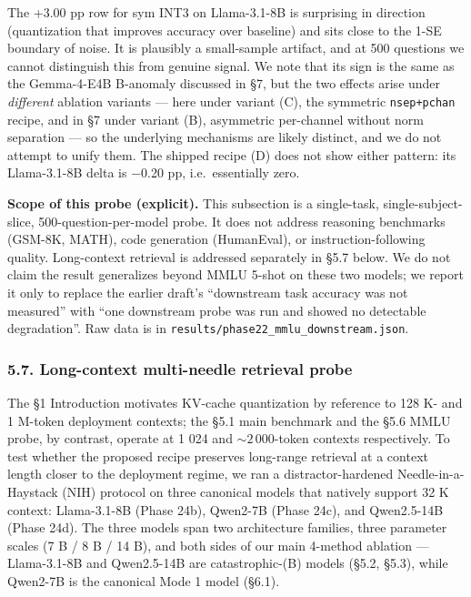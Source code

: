 \documentclass[
]{article}
\begin{document}
The +3.00 pp row for sym INT3 on Llama-3.1-8B is surprising in direction
(quantization that improves accuracy over baseline) and sits close to
the 1-SE boundary of noise. It is plausibly a small-sample artifact, and
at 500 questions we cannot distinguish this from genuine signal. We note
that its sign is the same as the Gemma-4-E4B B-anomaly discussed in §7,
but the two effects arise under \emph{different} ablation variants ---
here under variant (C), the symmetric \texttt{nsep+pchan} recipe, and in
§7 under variant (B), asymmetric per-channel without norm separation ---
so the underlying mechanisms are likely distinct, and we do not attempt
to unify them. The shipped recipe (D) does not show either pattern: its
Llama-3.1-8B delta is −0.20 pp, i.e.~essentially zero.

\textbf{Scope of this probe (explicit).} This subsection is a
single-task, single-subject-slice, 500-question-per-model probe. It does
not address reasoning benchmarks (GSM-8K, MATH), code generation
(HumanEval), or instruction-following quality. Long-context retrieval is
addressed separately in §5.7 below. We do not claim the result
generalizes beyond MMLU 5-shot on these two models; we report it only to
replace the earlier draft's ``downstream task accuracy was not
measured'' with ``one downstream probe was run and showed no detectable
degradation''. Raw data is in
\texttt{results/phase22\_mmlu\_downstream.json}.

\subsubsection{5.7. Long-context multi-needle retrieval
probe}\label{long-context-multi-needle-retrieval-probe}

The §1 Introduction motivates KV-cache quantization by reference to 128
K- and 1 M-token deployment contexts; the §5.1 main benchmark and the
§5.6 MMLU probe, by contrast, operate at 1 024 and \(\sim 2\,000\)-token
contexts respectively. To test whether the proposed recipe preserves
long-range retrieval at a context length closer to the deployment
regime, we ran a distractor-hardened Needle-in-a-Haystack (NIH) protocol
on three canonical models that natively support 32 K context:
Llama-3.1-8B (Phase 24b), Qwen2-7B (Phase 24c), and Qwen2.5-14B (Phase
24d). The three models span two architecture families, three parameter
scales (7 B / 8 B / 14 B), and both sides of our main 4-method ablation
--- Llama-3.1-8B and Qwen2.5-14B are catastrophic-(B) models (§5.2,
§5.3), while Qwen2-7B is the canonical Mode 1 model (§6.1).
\end{document}
